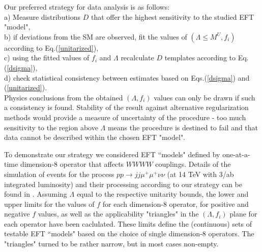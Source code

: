 Our preferred strategy for data analysis is as follows:\\
a)  Measure  distributions $D$ that
offer the highest sensitivity to the studied EFT "model",\\
b) if deviations from the SM are observed, fit the values of 
$(\Lambda\leq M^U, f_i)$  according to 
Eq.(\ref{unitarized}),\\
c) using the fitted values of $f_i$ and $\Lambda$ recalculate 
$D$  templates 
according to 
Eq.(\ref{dsigma}),\\
d) check statistical consistency between estimates based on Eqs.(\ref{dsigma}) and (\ref{unitarized}). \\
 Physics conclusions from the obtained $(\Lambda, f_i)$ values can only be drawn
if such a consistency is found.  
%
%
Stability of the result against alternative 
regularization methods  would provide a measure of uncertainty of the procedure - too much
sensitivity to the region above $\Lambda$ means the procedure is destined to fail
and  that data cannot be described within the chosen EFT "model".

%

To demonstrate our strategy we considered EFT ``models" defined by 
one-at-a-time dimension-8 operator that affects $WWWW$ couplings. Details of the simulation of events for  the process 
$pp \to jj\mu^+\mu^+\nu\nu$ (at 14 TeV with 3/ab integrated luminosity) and their processing according to our strategy can be found in \cite{Kalinowski:2018oxd}. 
Assuming $\Lambda$ equal to the respective unitarity bounds,
the lower and upper limits for the values of $f$ for each dimension-8 operator, for positive
and negative $f$ values, as well as the applicability "triangles" in the $(\Lambda,f_i)$ plane for each operator have been caclulated.
  These limits define the (continuous) sets of testable 
EFT ``models" based on the choice of single dimension-8 operators. 
The "triangles"  turned to be rather narrow, but in most cases non-empty.

